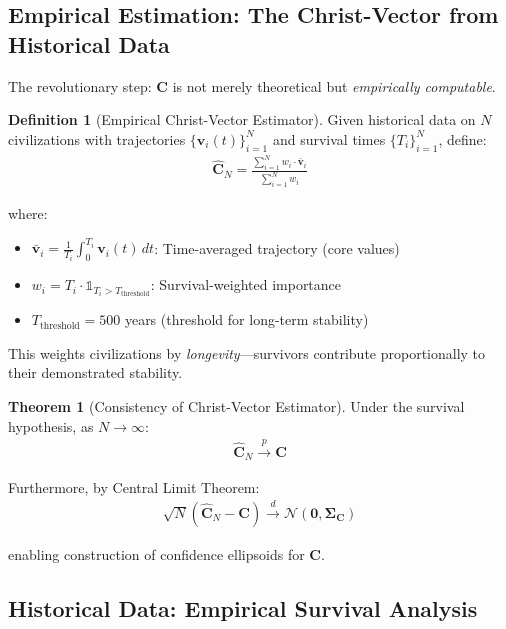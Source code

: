 \documentclass[11pt,a4paper]{article}
\theoremstyle{definition}
\newtheorem{definition}{Definition}[section]
\newtheorem{theorem}{Theorem}[section]
\theoremstyle{remark}
\begin{document}
\subsection{Empirical Estimation: The Christ-Vector from Historical Data}

The revolutionary step: \(\mathbf{C}\) is not merely theoretical but \textit{empirically computable}.

\begin{definition}[Empirical Christ-Vector Estimator]
Given historical data on \(N\) civilizations with trajectories \(\{\mathbf{v}_i(t)\}_{i=1}^N\) and survival times \(\{T_i\}_{i=1}^N\), define:
\begin{align}
\hat{\mathbf{C}}_N = \frac{\sum_{i=1}^N w_i \cdot \bar{\mathbf{v}}_i}{\sum_{i=1}^N w_i}
\end{align}

where:
\begin{itemize}
\item \(\bar{\mathbf{v}}_i = \frac{1}{T_i} \int_0^{T_i} \mathbf{v}_i(t) \, dt\): Time-averaged trajectory (core values)
\item \(w_i = T_i \cdot \mathbb{1}_{T_i > T_{\text{threshold}}}\): Survival-weighted importance
\item \(T_{\text{threshold}} = 500\) years (threshold for long-term stability)
\end{itemize}

This weights civilizations by \textit{longevity}—survivors contribute proportionally to their demonstrated stability.
\end{definition}

\begin{theorem}[Consistency of Christ-Vector Estimator]
Under the survival hypothesis, as \(N \to \infty\):
\begin{align}
\hat{\mathbf{C}}_N \xrightarrow{p} \mathbf{C}
\end{align}

Furthermore, by Central Limit Theorem:
\begin{align}
\sqrt{N}(\hat{\mathbf{C}}_N - \mathbf{C}) \xrightarrow{d} \mathcal{N}(\mathbf{0}, \boldsymbol{\Sigma}_{\mathbf{C}})
\end{align}

enabling construction of confidence ellipsoids for \(\mathbf{C}\).
\end{theorem}

\subsection{Historical Data: Empirical Survival Analysis}
\end{document}
